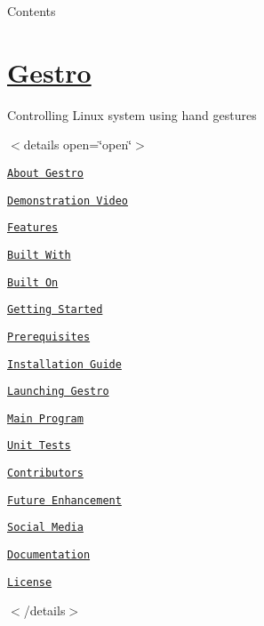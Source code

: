 Contents

\section*{\hyperlink{namespace_gestro}{Gestro}}

\href{https://github.com/RandomGuy-coder/Gestro}{\tt }

Controlling Linux system using hand gestures



     



$<$details open=\char`\"{}open\char`\"{}$>$


\begin{DoxyEnumerate}
\item \href{#About-Gestro}{\tt About Gestro} 
\begin{DoxyItemize}
\item \href{#Demonstration-Video}{\tt Demonstration Video} 
\item \href{#Features}{\tt Features} 
\item \href{#Built-With}{\tt Built With} 
\item \href{#Built-On}{\tt Built On} 
\end{DoxyItemize}
\item \href{#Getting-Started}{\tt Getting Started} 
\begin{DoxyItemize}
\item \href{#Prerequisites}{\tt Prerequisites} 
\item \href{#Installation-Guide}{\tt Installation Guide} 
\end{DoxyItemize}
\item \href{#Launching-Gestro}{\tt Launching Gestro} 
\begin{DoxyItemize}
\item \href{#Main-Program}{\tt Main Program} 
\item \href{#Unit-Tests}{\tt Unit Tests} 
\end{DoxyItemize}


\item \href{#Contributors}{\tt Contributors} 
\item \href{#Future-Enhancement}{\tt Future Enhancement} 
\item \href{#Social-Media}{\tt Social Media} 
\item \href{#Documentation}{\tt Documentation} 
\item \href{#License}{\tt License} 
\end{DoxyEnumerate}$<$/details$>$

